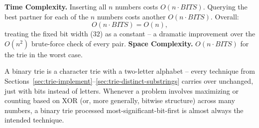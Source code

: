 \begin{complexitybox}
\textbf{Time Complexity.} Inserting all $n$ numbers costs $O(n \cdot
\textit{BITS})$. Querying the best partner for each of the $n$ numbers
costs another $O(n \cdot \textit{BITS})$. Overall:
\[
  O(n \cdot \textit{BITS}) = O(n),
\]
treating the fixed bit width ($32$) as a constant -- a dramatic
improvement over the $O(n^2)$ brute-force check of every pair.
\textbf{Space Complexity.} $O(n \cdot \textit{BITS})$ for the trie in the
worst case.
\end{complexitybox}

\begin{takeawaybox}
A binary trie is a character trie with a two-letter alphabet -- every
technique from Sections~\ref{sec:trie-implement}--\ref{sec:trie-distinct-substrings}
carries over unchanged, just with bits instead of letters. Whenever a
problem involves maximizing or counting based on XOR (or, more generally,
bitwise structure) across many numbers, a binary trie processed
most-significant-bit-first is almost always the intended technique.
\end{takeawaybox}
